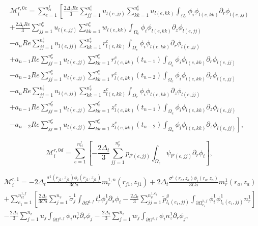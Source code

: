 \documentclass{article}
\begin{document}
\begin{equation}
\begin{array}{l} \mathcal{M}_i^{r,0c} = \sum_{e=1}^{n_{el}^f} \left[ \frac{2\Delta_t Re}{3} \sum_{jj=1}^{n_v^e} u_{l(e,jj)} \sum_{kk=1}^{n_v^e} u_{l(e,kk)} \int_{\Omega_e} \phi_i \phi_{l(e,kk)} \partial_r \phi_{l(e,jj)} \right. \\ + \frac{2\Delta_t Re}{3} \sum_{jj=1}^{n_v^e} u_{l(e,jj)} \sum_{kk=1}^{n_v^e} w_{l(e,kk)} \int_{\Omega_e} \phi_i \phi_{l(e,kk)} \partial_z \phi_{l(e,jj)} \\ - a_n Re \sum_{jj=1}^{n_v^e} u_{l(e,jj)} \sum_{kk=1}^{n_v^e} r_{l(e,kk)}^c \int_{\Omega_e} \phi_i \phi_{l(e,kk)} \partial_r \phi_{l(e,jj)} \\ + a_{n-1} Re \sum_{jj=1}^{n_v^e} u_{l(e,jj)} \sum_{kk=1}^{n_v^e} r_{l(e,kk)}^c(t_{n-1}) \int_{\Omega_e} \phi_i \phi_{l(e,kk)} \partial_r \phi_{l(e,jj)} \\ - a_{n-2} Re \sum_{jj=1}^{n_v^e} u_{l(e,jj)} \sum_{kk=1}^{n_v^e} r_{l(e,kk)}^c(t_{n-2}) \int_{\Omega_e} \phi_i \phi_{l(e,kk)} \partial_r \phi_{l(e,jj)} \\ - a_n Re \sum_{jj=1}^{n_v^e} u_{l(e,jj)} \sum_{kk=1}^{n_v^e} z_{l(e,kk)}^c \int_{\Omega_e} \phi_i \phi_{l(e,kk)} \partial_z \phi_{l(e,jj)} \\ + a_{n-1} Re \sum_{jj=1}^{n_v^e} u_{l(e,jj)} \sum_{kk=1}^{n_v^e} z_{l(e,kk)}^c(t_{n-1}) \int_{\Omega_e} \phi_i \phi_{l(e,kk)} \partial_z \phi_{l(e,jj)} \\ \left. - a_{n-2} Re \sum_{jj=1}^{n_v^e} u_{l(e,jj)} \sum_{kk=1}^{n_v^e} z_{l(e,kk)}^c(t_{n-2}) \int_{\Omega_e} \phi_i \phi_{l(e,kk)} \partial_z \phi_{l(e,jj)} \right], \end{array} \tag{4.108}
\end{equation}

\begin{equation}
\mathcal{M}_i^{r,0d} = \sum_{e=1}^{n_{el}^f} \left[ -\frac{2\Delta_t}{3} \sum_{jj=1}^{n_p^e} p_{l^p(e,jj)} \int_{\Omega_e} \psi_{l^p(e,jj)} \partial_r \phi_i \right], \tag{4.109}
\end{equation}

\begin{equation}
\begin{array}{l} \mathcal{M}_i^{r,1} = -2\Delta_t \frac{\sigma^1(r_{j1},z_{j1})\phi_i(r_{j1},z_{j1})}{3Ca} m_r^{1,n}(r_{j1},z_{j1}) + 2\Delta_t \frac{\sigma^1(r_a,z_a)\phi_i(r_a,z_a)}{3Ca} m_r^{1}(r_a,z_a) \\ + \sum_{e_1=1}^{n_{el}^{1,f}} \left[ \frac{2\Delta_t}{3Ca} \sum_{j=1}^{n_v} \tilde{\sigma}_j^1 \int_{\partial \Omega^{1,f}} t_r^1 \phi_j^1 \partial_s \phi_i - \frac{2\Delta_t}{3} \sum_{jj=1}^{n_v^{1,e_1}} \tilde{p}_{l_1(e_1,jj)}^g \int_{\partial \Omega_{e_1}^{1,f}} \phi_i^1 \phi_{l_1(e_1,jj)}^1 n_r^1 \right] \\ - \frac{2\Delta_t}{3} \sum_{j=1}^{n_v} u_j \int_{\partial \Omega^{1,f}} \phi_i n_r^1 \partial_r \phi_j - \frac{2\Delta_t}{3} \sum_{j=1}^{n_v} w_j \int_{\partial \Omega^{1,f}} \phi_i n_z^1 \partial_r \phi_j, \end{array} \tag{4.110}
\end{equation}
\end{document}
